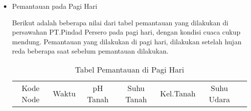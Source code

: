 \begin{itemize}
        
           \item Pemantauan pada Pagi Hari
           
           Berikut adalah beberapa nilai dari tabel pemantauan yang dilakukan di persawahan PT.Pindad Persero pada pagi hari, dengan kondisi cuaca cukup mendung. Pemantauan yang dilakukan di pagi hari, dilakukan setelah hujan reda beberapa saat sebelum pemantauan dilakukan.
           
           \begin{table}[H] 
            	\centering 
            	\caption{Tabel Pemantauan di Pagi Hari}
            	\label{tab:Tabel pemantauan pagi hari}
            	\begin{tabular}{ccccccc}
            		\toprule
            		 Kode Node & Waktu & pH Tanah & Suhu Tanah & Kel.Tanah & Suhu Udara \\
            

\end{tabular}
\end{table}
\end{itemize}
